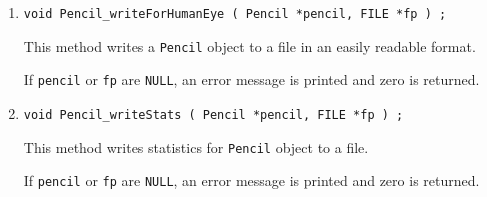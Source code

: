 \begin{enumerate}
\item
\begin{verbatim}
void Pencil_writeForHumanEye ( Pencil *pencil, FILE *fp ) ;
\end{verbatim}
\par
This method writes a {\tt Pencil} object to a file in an easily
readable format.
\par {}
If {\tt pencil} or {\tt fp} are {\tt NULL},
an error message is printed and zero is returned.
\item
\begin{verbatim}
void Pencil_writeStats ( Pencil *pencil, FILE *fp ) ;
\end{verbatim}
\par
This method writes statistics for  {\tt Pencil} object to a file.
\par {}
If {\tt pencil} or {\tt fp} are {\tt NULL},
an error message is printed and zero is returned.
\end{enumerate}
